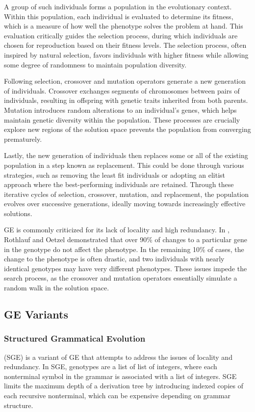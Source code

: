 \documentclass[runningheads]{llncs}
\begin{document}
A group of such individuals forms a population in the evolutionary context.
Within this population, each individual is evaluated to determine its fitness, which is a measure of how well the phenotype solves the problem at hand. 
This evaluation critically guides the selection process, during which individuals are chosen for reproduction based on their fitness levels. The selection process, often inspired by natural selection, favors individuals with higher fitness while allowing some degree of randomness to maintain population diversity.

Following selection, crossover and mutation operators generate a new generation of individuals. 
Crossover exchanges segments of chromosomes between pairs of individuals, resulting in offspring with genetic traits inherited from both parents. 
Mutation introduces random alterations to an individual's genes, which helps maintain genetic diversity within the population. 
These processes are crucially explore new regions of the solution space prevents the population from converging prematurely. 

Lastly, the new generation of individuals then replaces some or all of the existing population in a step known as replacement. 
This could be done through various strategies, such as removing the least fit individuals or adopting an elitist approach where the best-performing individuals are retained. 
Through these iterative cycles of selection, crossover, mutation, and replacement, the population evolves over successive generations, ideally moving towards increasingly effective solutions.

GE is commonly criticized for its lack of locality and high redundancy. 
In \cite{Rothlauf_Oetzel_2006}, Rothlauf and Oetzel demonstrated that over 90\% of changes to a particular gene in the genotype do not affect the phenotype.
In the remaining 10\% of cases, the change to the phenotype is often drastic, and two individuals with nearly identical genotypes may have very different phenotypes.
These issues impede the search process, as the crossover and mutation operators essentially simulate a random walk in the solution space.

\subsection{GE Variants}
\subsubsection{Structured Grammatical Evolution} (SGE) \cite{lourenco_sge_2016} is a variant of GE that attempts to address the issues of locality and redundancy.
In SGE, genotypes are a list of list of integers, where each nonterminal symbol in the grammar is associated with a list of integers.
SGE limits the maximum depth of a derivation tree by introducing indexed copies of each recursive nonterminal, which can be expensive depending on grammar structure.
\end{document}
